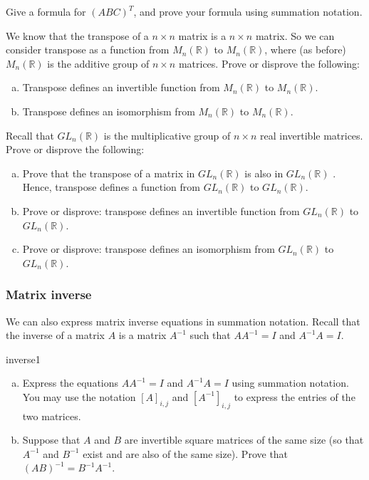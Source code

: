 \begin{exercise}{}
Give a formula for $(ABC)^T$, and prove your formula using summation notation.
\end{exercise}

\begin{exercise}{}
We know that the transpose of a $n \times n$ matrix is a $n \times n$ matrix.  So we can consider transpose as a function from $M_n(\mathbb{R})$ to $M_n(\mathbb{R})$, where (as before)  $M_n(\mathbb{R})$  is the additive group of $n \times n$ matrices. Prove or disprove the following:
\begin{enumerate}[(a)]
\item
Transpose defines an invertible function from $M_n(\mathbb{R})$ to $M_n(\mathbb{R})$.
\item
Transpose defines an isomorphism from $M_n(\mathbb{R})$ to $M_n(\mathbb{R})$.
\end{enumerate}
\end{exercise}

\begin{exercise}{}
Recall that $GL_n(\mathbb{R})$  is the multiplicative group of $n \times n$ real invertible matrices.
 Prove or disprove the following:
\begin{enumerate}[(a)]
\item
Prove that the transpose of a matrix in $GL_n(\mathbb{R})$  is also in $GL_n(\mathbb{R})$ .  Hence, transpose defines a function from $GL_n(\mathbb{R})$  to $GL_n(\mathbb{R})$. 
\item
Prove or disprove: transpose defines an invertible function from $GL_n(\mathbb{R})$ to $GL_n(\mathbb{R})$.
\item
Prove or disprove: transpose defines an isomorphism from $GL_n(\mathbb{R})$ to $GL_n(\mathbb{R})$.
\end{enumerate}
\end{exercise}


\subsubsection*{Matrix inverse}

We can also express matrix inverse equations in summation notation.  Recall that the inverse of a matrix $A$ is a matrix $A^{-1}$ such that $AA^{-1}=I$ and $A^{-1}A=I$.

\begin{exercise}{inverse1}
\begin{enumerate}[(a)]
\item
Express the equations $AA^{-1}=I$ and $A^{-1}A=I$ using summation notation.  You may use the notation $[A]_{i,j}$ and $[A^{-1}]_{i,j}$ to express the entries of the two matrices.
\item
Suppose that $A$ and $B$ are invertible square matrices of the same size (so that $A^{-1}$ and $B^{-1}$ exist and are also of the same size). Prove that $(AB)^{-1} = B^{-1}A^{-1}$.
\end{enumerate}
\end{exercise}

